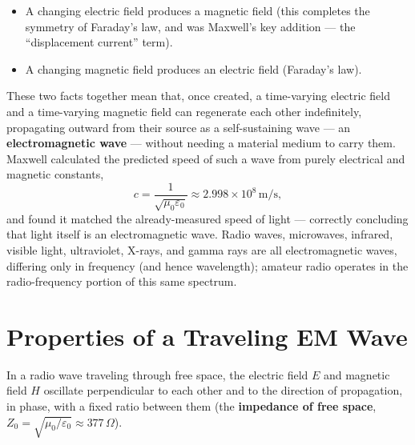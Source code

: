 \begin{itemize}
\item A changing electric field produces a magnetic field (this
completes the symmetry of Faraday's law, and was Maxwell's key
addition --- the ``displacement current'' term).
\item A changing magnetic field produces an electric field (Faraday's
law).
\end{itemize}

These two facts together mean that, once created, a time-varying
electric field and a time-varying magnetic field can regenerate each
other indefinitely, propagating outward from their source as a
self-sustaining wave --- an \textbf{electromagnetic wave} --- without
needing a material medium to carry them. Maxwell calculated the
predicted speed of such a wave from purely electrical and magnetic
constants,
\[
c = \frac{1}{\sqrt{\mu_0 \varepsilon_0}} \approx 2.998 \times 10^{8}\,\text{m/s},
\]
and found it matched the already-measured speed of light --- correctly
concluding that light itself is an electromagnetic wave. Radio waves,
microwaves, infrared, visible light, ultraviolet, X-rays, and gamma rays
are all electromagnetic waves, differing only in frequency (and hence
wavelength); amateur radio operates in the radio-frequency portion of
this same spectrum.

\section{Properties of a Traveling EM Wave}

In a radio wave traveling through free space, the electric field $E$ and
magnetic field $H$ oscillate perpendicular to each other and to the
direction of propagation, in phase, with a fixed ratio between them (the
\textbf{impedance of free space}, $Z_0 = \sqrt{\mu_0/\varepsilon_0}
\approx 377\,\Omega$).

\begin{center}
\end{center}


